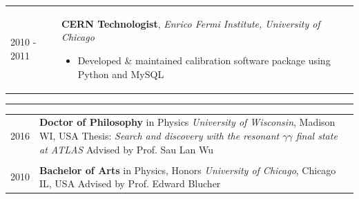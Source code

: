 \documentclass{letter}
\begin{document}
\begin{tabular}{p{}p{}}
  2010 - 2011
  &
  \textbf{CERN Technologist}, \textit{Enrico Fermi Institute, University of Chicago} \newline
  \vspace{-15pt}  %
  \begin{itemize}
    \itemsep0em
    \renewcommand{\labelitemi}{\tiny$\blacksquare$} 
    \item Developed \& maintained calibration software package using Python and MySQL
  \end{itemize}
\end{tabular}
\vspace{-10pt}



\begin{flushleft}
  \Large{\textsc{\textbf{\color{Maroon}{Education}}}}
  \vspace{1pt}  %
  \hrule
\end{flushleft}

\begin{tabular}{p{}p{}}

  2016
  &
  \textbf{Doctor of Philosophy} in Physics \newline 
  \textit{University of Wisconsin}, Madison WI, USA \newline
  Thesis: \textit{Search and discovery with the resonant $\gamma\gamma$ final state at ATLAS} \newline
  Advised by Prof. Sau Lan Wu \\
  \\

  2010 
  & 
  \textbf{Bachelor of Arts} in Physics, Honors \newline 
  \textit{University of Chicago}, Chicago IL, USA \newline
  Advised by Prof. Edward Blucher 
\end{tabular}
\end{document}
